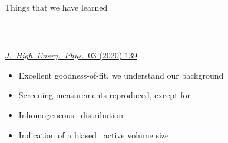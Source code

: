 \documentclass[10pt,aspectratio=169]{beamer}
\begin{document}
\begin{frame}{Things that we have learned}
  \begin{columns}
    \begin{column}{0.64\textwidth}
      \vspace*{-0.7cm} \\
      \begin{simpleblock}\centering
        \href{https://doi.org/10.1007/JHEP03(2020)139}{\emph{J.~High~Energ.~Phys.}~03 (2020) 139}
      \end{simpleblock}
      \begin{itemize}
        \item Excellent goodness-of-fit, \alert{we understand our background}
        \item Screening measurements reproduced, except for \kvn
        \item Inhomogeneous \kvz\ distribution
        \item Indication of a biased \bege\ active volume size
      \end{itemize}
    \end{column}
    \begin{column}{0.36\textwidth}
      \vspace*{1.6cm} \\
    \end{column}
  \end{columns}
\end{frame}
\end{document}
